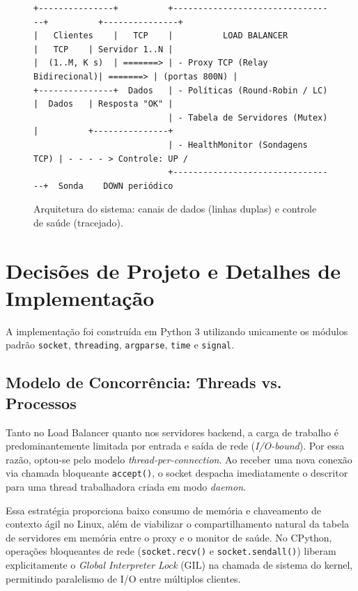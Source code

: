 \documentclass[11pt,a4paper]{article}
\begin{document}
\begin{figure}[!ht]
\centering
\small
\begin{verbatim}
+---------------+          +---------------------------------+          +---------------+
|   Clientes    |   TCP    |          LOAD BALANCER          |   TCP    | Servidor 1..N |
|  (1..M, K s)  | =======> | - Proxy TCP (Relay Bidirecional)| =======> | (portas 800N) |
+---------------+  Dados   | - Políticas (Round-Robin / LC)  |  Dados   | Resposta "OK" |
                           | - Tabela de Servidores (Mutex)  |          +---------------+
                           | - HealthMonitor (Sondagens TCP) | - - - - > Controle: UP /
                           +---------------------------------+  Sonda    DOWN periódico
\end{verbatim}
\vspace{-0.6em}
\caption{Arquitetura do sistema: canais de dados (linhas duplas) e controle de saúde (tracejado).}
\label{fig:arquitetura}
\end{figure}

\section{Decisões de Projeto e Detalhes de Implementação}

A implementação foi construída em Python 3 utilizando unicamente os módulos padrão \texttt{socket}, \texttt{threading}, \texttt{argparse}, \texttt{time} e \texttt{signal}.

\subsection{Modelo de Concorrência: Threads vs. Processos}
Tanto no Load Balancer quanto nos servidores backend, a carga de trabalho é predominantemente limitada por entrada e saída de rede (\textit{I/O-bound}). Por essa razão, optou-se pelo modelo \textit{thread-per-connection}. Ao receber uma nova conexão via chamada bloqueante \texttt{accept()}, o socket despacha imediatamente o descritor para uma thread trabalhadora criada em modo \textit{daemon}.

Essa estratégia proporciona baixo consumo de memória e chaveamento de contexto ágil no Linux, além de viabilizar o compartilhamento natural da tabela de servidores em memória entre o proxy e o monitor de saúde. No CPython, operações bloqueantes de rede (\texttt{socket.recv()} e \texttt{socket.sendall()}) liberam explicitamente o \textit{Global Interpreter Lock} (GIL) na chamada de sistema do kernel, permitindo paralelismo de I/O entre múltiplos clientes.
\end{document}
